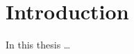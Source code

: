 \documentclass[12pt, class=report, crop=false]{standalone}
\begin{document}
\chapter{Introduction}%
\label{chap:intro}

In this thesis \dots

\end{document}
